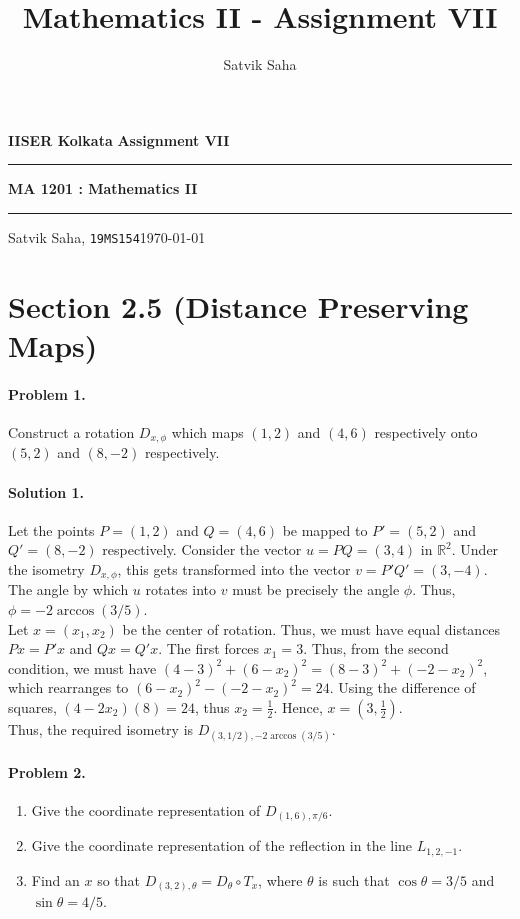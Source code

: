 \documentclass[10pt]{article}
\title{Mathematics II - Assignment VII}
\author{Satvik Saha}
\date{}
\begin{document}
        \par\textbf{IISER Kolkata} \hfill \textbf{Assignment VII}
        \vspace{3pt}
        \hrule
        \vspace{3pt}
        \begin{center}
                \LARGE{\textbf{MA 1201 : Mathematics II}}
        \end{center}
        \vspace{3pt}
        \hrule
        \vspace{3pt}
        Satvik Saha, \texttt{19MS154}\hfill\today
        \vspace{20pt}

        \section*{Section 2.5 (Distance Preserving Maps)}
        \paragraph{Problem 1.} Construct a rotation $D_{x,\phi}$ which maps $(1, 2)$ and $(4, 6)$ respectively onto $(5, 2)$
        and $(8, -2)$ respectively.
        \paragraph{Solution 1.}
        Let the points $P = (1, 2)$ and $Q = (4, 6)$ be mapped to $P' = (5, 2)$ and $Q' = (8, -2)$ respectively.
        Consider the vector $u = PQ = (3, 4)$ in $\mathbb{R}^2$. Under the isometry $D_{x,\phi}$, this gets transformed
        into the vector $v = P'Q' = (3, -4)$. The angle by which $u$ rotates into $v$ must be precisely the angle $\phi$.
        Thus, $\phi = -2\arccos(3 /5)$. \\

        Let $x = (x_1, x_2)$ be the center of rotation. Thus, we must have equal distances  $Px = P'x$ and $Qx = Q'x$.
        The first forces $x_1 = 3$. Thus, from the second condition, we must have $(4-3)^2 + (6-x_2)^2 = (8-3)^2 + (-2-x_2)^2$,
        which rearranges to $(6 - x_2)^2 - (-2-x_2)^2 = 24$. Using the difference of squares, $(4 - 2x_2)(8) = 24$, thus
        $x_2 = \frac{1}{2}$. Hence, $x = (3, \frac{1}{2})$. \\

        Thus, the required isometry is $D_{(3, 1 /2), -2\arccos(3 /5)}$.

        \paragraph{Problem 2.}
        \begin{enumerate}
                \item Give the coordinate representation of $D_{(1, 6), \pi /6}$.
                \item Give the coordinate representation of the reflection in the line $L_{1,2,-1}$.
                \item Find an $x$ so that $D_{(3, 2),\theta} = D_\theta \circ T_x$, where $\theta$ is such that
                $\cos\theta = 3 / 5$ and $\sin\theta = 4 /5$.
        \end{enumerate}
\end{document}
